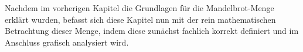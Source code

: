 
Nachdem im vorherigen Kapitel die Grundlagen für die Mandelbrot-Menge
erklärt wurden, befasst sich diese Kapitel nun mit der rein mathematischen Betrachtung
dieser Menge, indem diese zunächst fachlich korrekt definiert und
im Anschluss grafisch analysiert wird.


